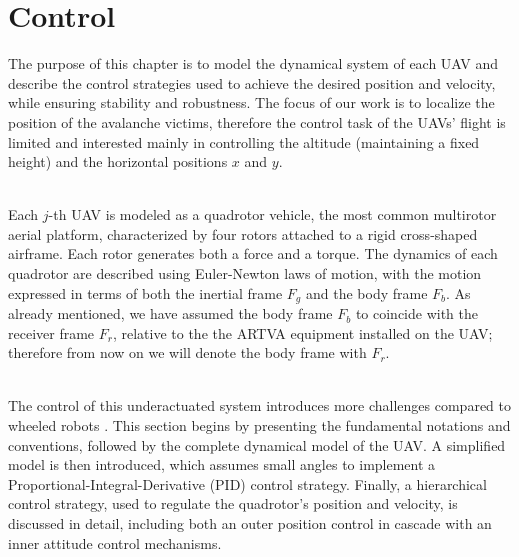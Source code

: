 \documentclass[main]{subfiles}
\begin{document}
\section{Control}
The purpose of this chapter is to model the dynamical system 
of each UAV and describe the control strategies used to achieve the 
desired position and velocity, while ensuring stability and robustness.
The focus of our work is to localize the position of the 
avalanche victims, therefore the control task of the UAVs' flight 
is limited and interested mainly in controlling the altitude 
(maintaining a fixed height) and the horizontal positions
$x$ and $y$.

\noindent\\
Each $j$-th UAV is modeled as a quadrotor vehicle, the most common 
multirotor aerial platform, characterized by four rotors attached 
to a rigid cross-shaped airframe. Each rotor generates 
both a force and a torque. The dynamics of each quadrotor are 
described using Euler-Newton laws of motion, with the motion 
expressed in terms of both the inertial frame \( F_g \) and the 
body frame \( F_b \).
As already mentioned, we have assumed the body frame $F_b$
to coincide with the receiver frame $F_r$, relative to the
the ARTVA equipment installed on the UAV; therefore 
from now on we will denote the body frame with $F_r$.

\noindent\\
The control of this underactuated system introduces more challenges 
compared to wheeled robots \cite{model_quadrotor}. This section begins 
by presenting the fundamental notations and conventions, 
followed by the complete dynamical model of the UAV. A simplified model is 
then introduced, which assumes small angles to implement a 
Proportional-Integral-Derivative (PID) control strategy. 
Finally, a hierarchical control strategy, used to regulate the 
quadrotor's position and velocity, is discussed in detail, 
including both an outer position control in cascade with an inner 
attitude control mechanisms.
\end{document}
